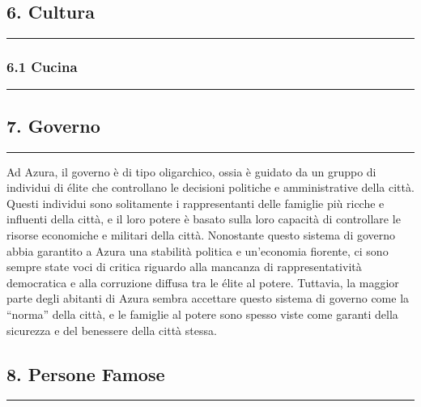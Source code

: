 \subsection{6. Cultura}\label{cultura}

\begin{center}\rule{0.5\linewidth}{0.5pt}\end{center}

\subsubsection{6.1 Cucina}\label{cucina}

\begin{center}\rule{0.5\linewidth}{0.5pt}\end{center}

\subsection{7. Governo}\label{governo}

\begin{center}\rule{0.5\linewidth}{0.5pt}\end{center}

Ad Azura, il governo è di tipo oligarchico, ossia è guidato da un gruppo
di individui di élite che controllano le decisioni politiche e
amministrative della città. Questi individui sono solitamente i
rappresentanti delle famiglie più ricche e influenti della città, e il
loro potere è basato sulla loro capacità di controllare le risorse
economiche e militari della città. Nonostante questo sistema di governo
abbia garantito a Azura una stabilità politica e un'economia fiorente,
ci sono sempre state voci di critica riguardo alla mancanza di
rappresentatività democratica e alla corruzione diffusa tra le élite al
potere. Tuttavia, la maggior parte degli abitanti di Azura sembra
accettare questo sistema di governo come la ``norma'' della città, e le
famiglie al potere sono spesso viste come garanti della sicurezza e del
benessere della città stessa.

\subsection{8. Persone Famose}\label{persone-famose}

\begin{center}\rule{0.5\linewidth}{0.5pt}\end{center}
